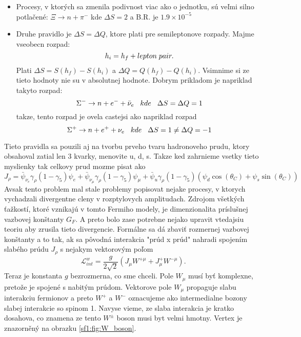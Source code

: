 \documentclass[../../main.tex]{subfiles}
\begin{document}
\begin{itemize}
	\item Procesy, v ktorých sa zmenila podivnost viac ako o jednotku, sú veľmi silno potlačené: $\Xi\rightarrow n+\pi^{-}$ kde $\Delta S=2$ a B.R. je $1.9\times 10^{-5}$
	\item Druhe pravidlo je $\Delta S = \Delta Q$, ktore plati pre semileptonove rozpady. Majme vseobecn rozpad: $$
		h_i=h_f+lepton \hspace{0.1cm} pair.
		$$ 
	Plati $\Delta S = S(h_f)-S(h_i)$ a $\Delta Q = Q(h_f)-Q(h_i)$. Vsimnime si ze tieto hodnoty nie su v absolutnej hodnote. Dobrym prikladom je napriklad takyto rozpad:
	$$
		\Sigma^-\rightarrow n+e^-+\bar{\nu}_e \hspace{0.3cm} kde \hspace{0.3cm} \Delta S=\Delta Q = 1
	$$
	takze, tento rozpad je ovela castejsi ako napriklad rozpad 
	$$
		\Sigma^+\rightarrow n+e^++\nu_e \hspace{0.3cm} kde \hspace{0.3cm} \Delta S=1 \neq \Delta Q = -1
	$$
\end{itemize}
Tieto pravidla sa pouzili aj na tvorbu prveho tvaru hadronoveho prudu, ktory obsahoval zatial len 3 kvarky, menovite u, d, s. Takze ked zahrnieme vsetky tieto myslienky tak celkovy prud mozme pisat ako 
\begin{equation}
J_{\rho}=\bar{\psi}_{\nu_{e}}\gamma_{\rho}(1-\gamma_5)\psi_{e} + \bar{\psi}_{\nu_{\mu}}\gamma_{\rho}(1-\gamma_5)\psi_{\mu}+\bar{\psi}_{u}\gamma_{\rho}(1-\gamma_5)(\psi_{d}\cos(\theta_C)+\psi_s\sin(\theta_C))
\end{equation}
Avsak tento problem mal stale problemy popisovat nejake procesy, v ktorych vychadzali divergentne cleny v rozptylovych amplitudach. Zdrojom všetkých ťažkostí, ktoré vznikajú v tomto Fermiho modely, je dimenzionalita
príslušnej vazbovej konštanty $G_F$. A preto bolo zase potrebne nejako upravit vtedajsiu teoriu aby zrusila tieto divergencie. Formálne sa dá zbaviť rozmernej vazbovej konštanty a to tak, ak sa pôvodná interakcia "prúd x prúd" nahradi spojením slabého prúdu $J_{\rho}$ s nejakym  vektorovým poľom
\begin{equation}
\mathcal{L}_{int}^{w}=\frac{g}{2\sqrt{2}}(J_{\mu}W^{+\mu}+J_{\mu}^+W^{-\mu}). 
\end{equation}
Teraz je konstanta $g$ bezrozmerna, co sme chceli. Pole $W_{\mu}$ musí byť komplexne, pretože je spojené s nabitým prúdom. Vektorove pole $W_{\mu}$ propaguje slabu interakciu fermionov a preto $W^+$ a $W^-$ oznacujeme ako intermedialne bozony slabej interakcie so spinom 1. Navyse vieme, ze slaba interakcia je kratko dosahova, co znamena ze tento $W^{\pm}$ boson musi byt velmi hmotny. Vertex je znazorněný na obrazku \ref{sf1:fig:W_boson}.
\end{document}

